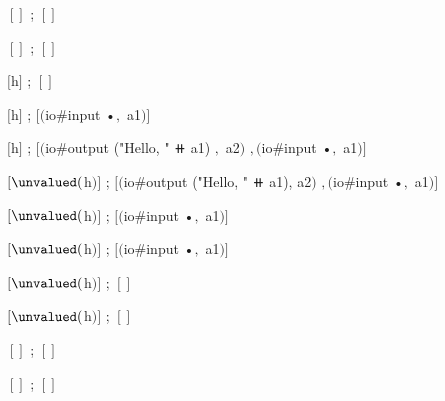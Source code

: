 \begin{snippet}
$[]$ ; $[]$

$[]$ ; $[]$

$[$h$]$ ; $[]$

$[$h$]$ ; $[$$($io#input •$,$ a1$)$$]$

$[$h$]$
; $[$$($io#output ("Hello, " ⧺ a1) $,$ a2$)$
  $,$$($io#input •$,$ a1$)$$]$

$[\unvalued($h$)]$
; $[$$($io#output ("Hello, " ⧺ a1), a2$)$
  $,$$($io#input •$,$ a1$)$$]$

$[\unvalued($h$)]$ ; $[$$($io#input •$,$ a1$)$$]$


$[\unvalued($h$)]$ ; $[$$($io#input •$,$ a1$)$$]$


$[\unvalued($h$)]$ ; $[]$


$[\unvalued($h$)]$ ; $[]$

$[]$ ; $[]$


$[]$ ; $[]$
\end{snippet}
